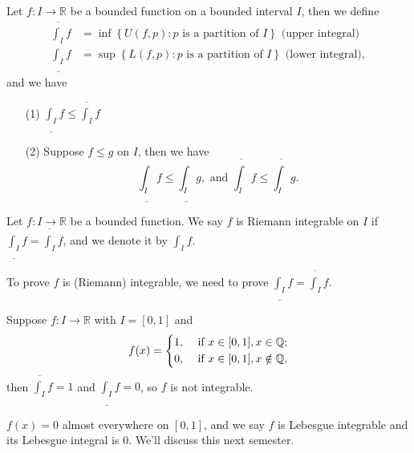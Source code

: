\begin{proposition}
    Let \(f:I \to \mathbb{R} \) be a bounded function on a bounded interval \(I\), then we define
    \begin{align*}
        \overline{\int _I }f &= \inf \left\{ U(f, p): p \text{ is a partition of } I  \right\} \text{ (upper integral)}  \\
        \underline{\int _I }f &= \sup \left\{ L(f, p): p \text{ is a partition of } I  \right\} \text{ (lower integral)}, 
    \end{align*} and we have 
    \begin{itemize}
        \item [(1)] \(\underline{\int _I} f \le \overline{\int _I} f  \) 
        \item [(2)] Suppose \(f \le g\) on \(I\), then we have 
        \[
            \underline{\int _I}f \le \underline{\int _I}g, \text{ and } \overline{\int _I}f \le \overline{\int _I}g.   
        \]
    \end{itemize}
\end{proposition}

\begin{definition} \label{def: Riemann integrable}
    Let \(f:I \to \mathbb{R} \) be a bounded function. We say \(f\) is Riemann integrable on \(I\) if \(\underline{\int _I}f = \overline{\int _I}f \), and we denote it by \(\int _I f\).     
\end{definition}

\begin{remark}
    To prove \(f\) is (Riemann) integrable, we need to prove \(\underline{\int _I} f = \overline{\int _I}f  \).  
\end{remark}

\begin{eg}
    Suppose \(f: I \to \mathbb{R} \) with \(I = [0, 1]\) and   
    \[
        f(x) = \begin{dcases}
            1, &\text{ if } x \in [0, 1], x \in \mathbb{Q}   ;\\
            0, &\text{ if } x \in [0, 1], x \notin \mathbb{Q} ,
        \end{dcases}
    \] then \(\overline{\int _I} f = 1 \) and \(\underline{\int _I} f = 0\), so \(f\) is not integrable. 
    \begin{note}
        \(f(x) = 0\) almost everywhere on \([0, 1]\), and we say \(f\) is Lebesgue integrable and its Lebesgue integral is \(0\). We'll discuss this next semester.    
    \end{note}   
\end{eg}


